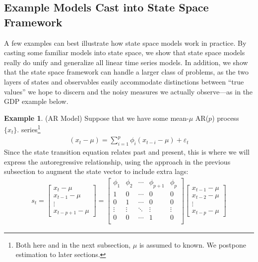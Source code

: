 \documentclass[12pt]{article}
\theoremstyle{plain}
\theoremstyle{definition}
\newtheorem{ex}[thm]{Example}
\theoremstyle{remark}
\begin{document}
\clearpage
\subsection{Example Models Cast into State Space Framework}

A few examples can best illustrate how state space models work in
practice. By casting some familiar models into state space, we show
that state space models really do unify and generalize all linear time
series models. In addition, we show that the state space framework can
handle a larger class of problems, as the two layers of states and
observables easily accommodate distinctions between ``true values'' we
hope to discern and the noisy measures we actually observe---as in the
GDP example below.

\begin{ex}(AR Model)
Suppose that we have some mean-$\mu$ AR($p$) process $\{x_t\}$.
series\footnote{%
  Both here and in the next subsection, $\mu$ is assumed to known.
  We postpone estimation to later sections.
}
\begin{align*}
  (x_t - \mu) = \sum^p_{i=1} \phi_i (x_{t-i} - \mu)
  + \varepsilon_t
\end{align*}
Since the state transition equation relates past and present, this is
where we will express the autoregressive relationship, using the
approach in the previous subsection to augment the state vector to
include extra lags:
\begin{align*}
  s_t =
  \begin{bmatrix} x_t - \mu \\ x_{t-1} - \mu \\ \vdots \\
    x_{t-p+1} - \mu \end{bmatrix}
  =
  \begin{bmatrix}
    \phi_1 & \phi_2 & \cdots & \phi_{p+1} & \phi_p \\
    1 & 0 & \cdots & 0 & 0 \\
    0 & 1 & \cdots & 0 & 0 \\
    \vdots & \vdots & \ddots & \vdots & \vdots \\
    0 & 0 & \cdots & 1 & 0 \\
  \end{bmatrix}
  \begin{bmatrix} x_{t-1} - \mu \\ x_{t-2} - \mu \\ \vdots \\
    x_{t-p}- \mu \end{bmatrix}

\end{align*}
\end{ex}
\end{document}
